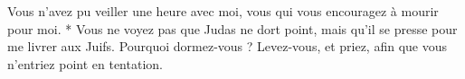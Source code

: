 Vous n’avez pu veiller une heure avec moi, vous qui vous encouragez à mourir pour moi. * Vous ne voyez pas que Judas ne dort point, mais qu’il se presse pour me livrer aux Juifs.
\versseparator
Pourquoi dormez-vous ? Levez-vous, et priez, afin que vous n’entriez point en tentation.